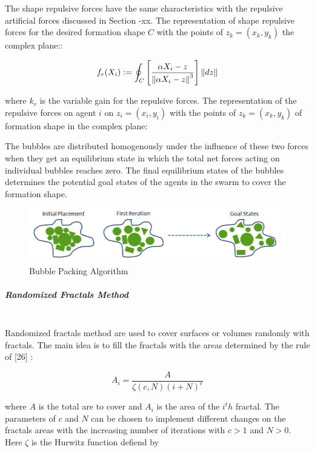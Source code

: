 The shape repulsive forces have the same characteristics with the repulsive artificial forces discussed in Section -xx. The representation of shape repulsive forces for the desired formation shape $C$ with the points of  $z_k = (x_k,y_k)$ the complex plane::
	
\begin{equation}
f_r(X_i) := \oint_C \left[\frac{\alpha X_i - z}{\left\lVert\alpha X_i - z\right\rVert^3}\right] \left\lVert dz\right\rVert
\end{equation}

where $k_r$ is the variable gain for the repulsive forces. The representation of the repulsive forces on agent $i$ on $z_i = (x_i, y_i)$ with the points of  $z_k = (x_k,y_k)$ of formation shape in the complex plane:
	
The bubbles are distributed homogenously under the influence of these two forces when they get an equilibrium state in which the total net forces acting on individual bubbles reaches zero. The final equilibrium states of the bubbles determines the potential goal states of the agents in the swarm to cover the formation shape. 

\begin{figure}[H]
\caption{Bubble Packing Algorithm}
\centering
\includegraphics[scale = 0.70]{bubble_packing2}
\end{figure}

\subparagraph{Randomized Fractals Method}\hspace{0pt} \\
Randomized fractals method are used to cover surfaces or volumes randomly with fractals. The main idea is to fill the fractals with the areas determined by the rule of [26] :

\begin{equation}
A_i = \frac{A}{\zeta(c,N)(i+N)^c}
\end{equation}

where $A$ is the total are to cover and $A_i$ is the area of the $i^th$ fractal. The parameters of $c$ and $N$ can be chosen to implement different changes on the fractals areas with the increasing number of iterations with $c>1$ and $N>0$. Here  $\zeta$ is the Hurwitz function defiend by

